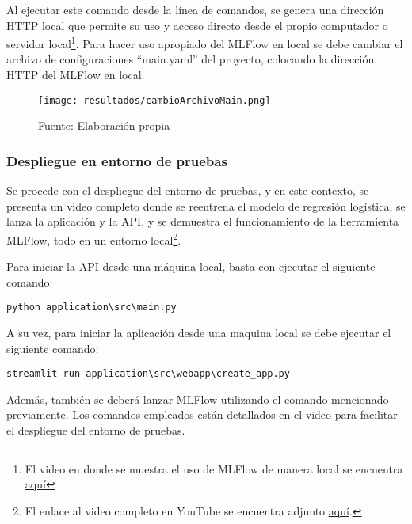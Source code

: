 Al ejecutar este comando desde la línea de comandos, se genera una dirección HTTP local que permite su uso y acceso directo desde el propio computador o servidor local\footnote{El video en donde se muestra el uso de MLFlow de manera local se encuentra \href{https://youtu.be/w4WX-OeOkrQ}{aquí}}.
Para hacer uso apropiado del MLFlow en local se debe cambiar el archivo de configuraciones ``main.yaml'' del proyecto, colocando la dirección HTTP del MLFlow en local.

\begin{figure}[h]
\centering
\caption{Configuración local del MLFlow en el archivo ``main.yaml''}
\texttt{[image: resultados/cambioArchivoMain.png]}
\caption*{\footnotesize Fuente: Elaboración propia}
\label{fig:figuraCambioArchivoMain}
\end{figure}

\subsubsection{Despliegue en entorno de pruebas}

Se procede con el despliegue del entorno de pruebas, y en este contexto, se presenta un video completo donde se reentrena el modelo de regresión logística, se lanza la aplicación y la API, y se demuestra el funcionamiento de la herramienta MLFlow, todo en un entorno local\footnote{El enlace al video completo en YouTube se encuentra adjunto \href{https://youtu.be/1rctGi8Sb7Q}{aquí}.}.

Para iniciar la API desde una máquina local, basta con ejecutar el siguiente comando: \begin{verbatim}python application\src\main.py\end{verbatim}

\newpage

A su vez, para iniciar la aplicación desde una maquina local se debe ejecutar el siguiente comando: \begin{verbatim}streamlit run application\src\webapp\create_app.py\end{verbatim}

Además, también se deberá lanzar MLFlow utilizando el comando mencionado previamente. Los comandos empleados están detallados en el video para facilitar el despliegue del entorno de pruebas.